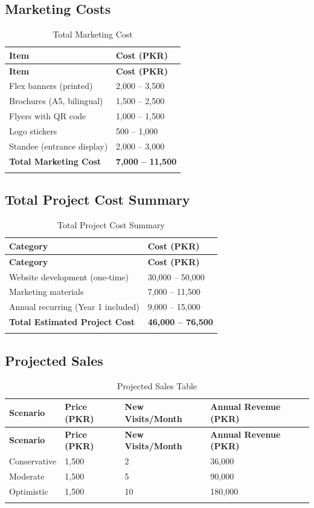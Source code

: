 \documentclass[12pt, a4paper]{article}
\begin{document}
\subsection{Marketing Costs}

\begin{longtable}{@{} L{9cm} R{5.4cm} @{}}
\toprule
\textbf{Item} & \textbf{Cost (PKR)} \\
\midrule
\endfirsthead
\toprule
\textbf{Item} & \textbf{Cost (PKR)} \\
\midrule
\endhead
Flex banners (printed) & 2,000 – 3,500 \\[4pt]
Brochures (A5, bilingual) & 1,500 – 2,500 \\[4pt]
Flyers with QR code & 1,000 – 1,500 \\[4pt]
Logo stickers & 500 – 1,000 \\[4pt]
Standee (entrance display) & 2,000 – 3,000 \\
\midrule
\textbf{Total Marketing Cost} & \textbf{7,000 – 11,500} \\
\bottomrule
\caption{Total Marketing Cost}
\end{longtable}

\subsection{Total Project Cost Summary}

\begin{longtable}{@{} L{9cm} R{5.4cm} @{}}
\toprule
\textbf{Category} & \textbf{Cost (PKR)} \\
\midrule
\endfirsthead
\toprule
\textbf{Category} & \textbf{Cost (PKR)} \\
\midrule
\endhead
Website development (one-time) & 30,000 – 50,000 \\[4pt]
Marketing materials & 7,000 – 11,500 \\[4pt]
Annual recurring (Year 1 included) & 9,000 – 15,000 \\
\midrule
\textbf{Total Estimated Project Cost} & \textbf{46,000 – 76,500} \\
\bottomrule
\caption{Total Project Cost Summary}
\end{longtable}

\subsection{Projected Sales}

\begin{longtable}{@{} L{5.5cm} C{2.5cm} C{3cm} R{3.4cm} @{}}
\toprule
\textbf{Scenario} & \textbf{Price (PKR)} & \textbf{New Visits/Month} & \textbf{Annual Revenue (PKR)} \\
\midrule
\endfirsthead
\toprule
\textbf{Scenario} & \textbf{Price (PKR)} & \textbf{New Visits/Month} & \textbf{Annual Revenue (PKR)} \\
\midrule
\endhead
Conservative & 1,500 & 2 & 36,000 \\[4pt]
Moderate & 1,500 & 5 & 90,000 \\[4pt]
Optimistic & 1,500 & 10 & 180,000 \\
\bottomrule
\caption{Projected Sales Table}
\end{longtable}
\end{document}
